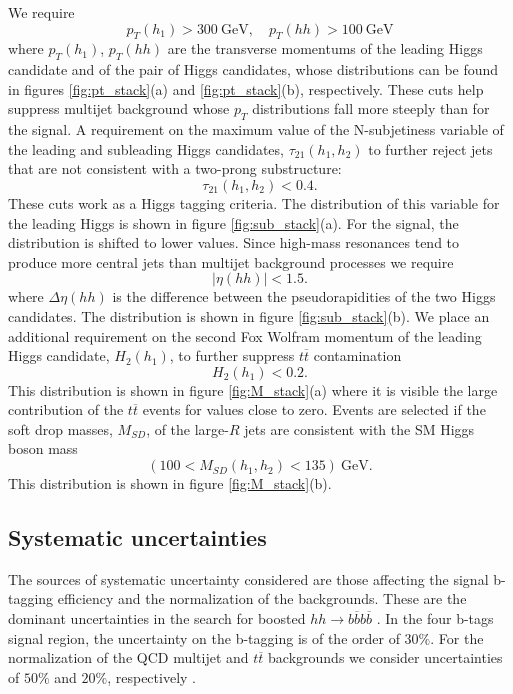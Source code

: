 We require
\begin{equation}
	p_T(h_1)>300~\text{GeV}, \quad p_T(hh)>100 ~\text{GeV}
\end{equation}
where $p_T(h_1)$, $p_T(hh)$ are the transverse momentums of the leading Higgs candidate and of the pair of Higgs candidates, whose distributions can be found in figures \ref{fig:pt_stack}(a) and \ref{fig:pt_stack}(b), respectively.
These cuts help suppress multijet background whose $p_T$ distributions fall more steeply than for the signal. A requirement on the maximum value of the N-subjetiness variable of the leading and subleading Higgs candidates, $\tau_{21}(h_1,h_2)$ to further reject jets that are not consistent with a two-prong substructure:
\begin{equation}
	\tau_{21}(h_1,h_2)<0.4.
\end{equation}
These cuts work as a Higgs tagging criteria. The distribution of this variable for the leading Higgs is shown in figure \ref{fig:sub_stack}(a). For the signal, the distribution is shifted to lower values.
Since high-mass resonances tend to produce more central jets than multijet background processes we require
\begin{equation}
	|\eta(hh)|<1.5.
\end{equation}
where $\Delta\eta(hh)$ is the difference between the pseudorapidities of the two Higgs candidates. The distribution is shown in figure \ref{fig:sub_stack}(b).
We place an additional requirement on the second Fox Wolfram momentum of the leading Higgs candidate, $H_2(h_1)$, to further suppress $t\overline{t}$ contamination
\begin{equation}
	H_2(h_1)<0.2.
\end{equation}
This distribution is shown in figure \ref{fig:M_stack}(a) where it is visible the large contribution of the $t\overline{t}$ events for values close to zero. 
Events are selected if the soft drop masses, $M_{SD}$, of the large-$R$ jets are consistent with the SM Higgs boson mass
\begin{equation}
	(100<M_{SD}(h_1,h_2)<135) ~\text{GeV}.
\end{equation}
This distribution is shown in figure \ref{fig:M_stack}(b).

\subsection{Systematic uncertainties}

The sources of systematic uncertainty considered are those affecting the signal b-tagging efficiency and the normalization of the backgrounds. These are the dominant uncertainties in the search for boosted $hh\rightarrow b\overline{b}b\overline{b}$ \cite{hh2bbbbATLAS1}. In the four b-tags signal region, the uncertainty on the b-tagging is of the order of $30\%$. For the normalization of the QCD multijet and $t\overline{t}$ backgrounds we consider uncertainties of $50\%$ and $20\%$, respectively \cite{FCCphysClement}.

